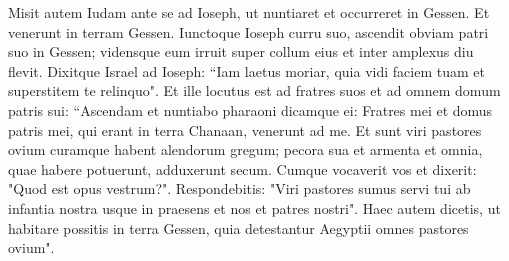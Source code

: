 \begin{biblechapter}
\verse Misit autem Iudam ante se ad Ioseph, ut nuntiaret et occurreret in Gessen.  
\verse Et venerunt in terram Gessen. Iunctoque Ioseph curru suo, ascendit obviam patri suo in Gessen; vidensque eum irruit super collum eius et inter amplexus diu flevit. 
\verse Dixitque Israel ad Ioseph: “Iam laetus moriar, quia vidi faciem tuam et superstitem te relinquo". 
\verse Et ille locutus est ad fratres suos et ad omnem domum patris sui: “Ascendam et nuntiabo pharaoni dicamque ei: Fratres mei et domus patris mei, qui erant in terra Chanaan, venerunt ad me. 
\verse Et sunt viri pastores ovium curamque habent alendorum gregum; pecora sua et armenta et omnia, quae habere potuerunt, adduxerunt secum. 
\verse Cumque vocaverit vos et dixerit: "Quod est opus vestrum?". 
\verse Respondebitis: "Viri pastores sumus servi tui ab infantia nostra usque in praesens et nos et patres nostri". Haec autem dicetis, ut habitare possitis in terra Gessen, quia detestantur Aegyptii omnes pastores ovium". 
\end{biblechapter}

